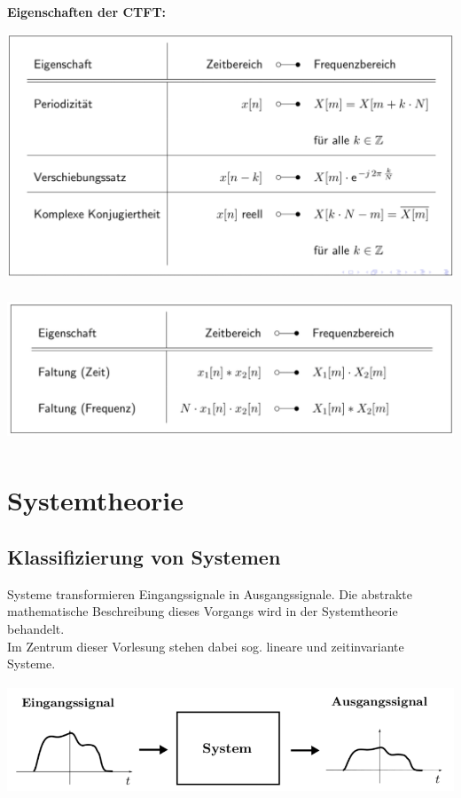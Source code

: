 \documentclass[12pt,a4paper]{scrartcl}
\begin{document}
  \noindent \textbf{Eigenschaften der CTFT:}\\
  \includegraphics[height = 8cm]{Pictures/EigenschaftenDFT.png}\\
  \includegraphics[height = 4.5cm]{Pictures/EigenschaftenDFT2.png}\\

  \newpage    
  
  \section{Systemtheorie}


  \subsection{Klassifizierung von Systemen}
  \label{sec:sub:klassifizierung-von-systemen}

  \noindent Systeme transformieren Eingangssignale in Ausgangssignale. Die abstrakte mathematische Beschreibung dieses Vorgangs wird in der Systemtheorie behandelt. \\
  Im Zentrum dieser Vorlesung stehen dabei sog. lineare und zeitinvariante Systeme. \\
  \includegraphics[height=4cm]{Pictures/Systeme.png}
\end{document}
